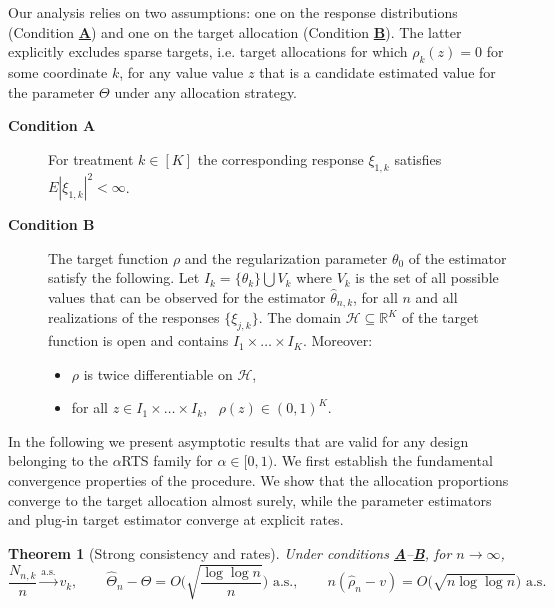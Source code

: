 \documentclass[11pt]{article}
\theoremstyle{plain}
\newtheorem{theorem}{Theorem}[section]
\theoremstyle{definition}
\begin{document}
Our analysis relies on two assumptions: one on the response distributions (Condition \hyperlink{CA}{\textbf{A}}) and one on the target allocation (Condition \hyperlink{CB}{\textbf{B}}). The latter explicitly excludes sparse targets, i.e. target allocations for which $\rho_k(z)=0$ for some coordinate $k$, for any value value $z$ that is a candidate estimated value for the parameter $\Theta$ under any allocation strategy.

\begin{description}
	\item[\hypertarget{CA}{\textbf{Condition A}}] For treatment \(k \in [K]\) the corresponding response \(\xi_{1,k}\) satisfies  $
	E|\xi_{1,k}|^{2} < \infty $. \\
	
	\item[\hypertarget{CB}{\textbf{Condition B}}] The target function $\rho$ and the regularization parameter $\theta_0$ of the estimator satisfy the following. Let $I_k = \{\theta_k\} \bigcup V_k$ where $V_k$ is the set of all possible values that can be observed for the estimator $\hat\theta_{n,k}$, for all $n$ and all realizations of the responses $\{\xi_{j,k}\}$. The domain $\mathcal{H} \subseteq \mathbb{R}^K$ of the target function is open and contains $I_1\times \dots \times I_K$. Moreover:
	\begin{itemize}
		\item \(\rho\) is twice differentiable on $\mathcal{H}$,
		\item for all $z \in I_1\times \dots \times I_k$, \ \(\rho(z) \in (0,1)^K\).
	\end{itemize}
\end{description}

In the following we present asymptotic results that are valid for any design belonging to the \(\alpha\)RTS family for \(\alpha \in [0,1)\). We first establish the fundamental convergence properties of the procedure. We show that the allocation proportions converge to the target allocation almost surely, while the parameter estimators and plug-in target estimator converge at explicit rates.

\begin{theorem}[Strong consistency and rates]\label{thm:LLN}
	Under conditions \hyperlink{CA}{\textbf{A}}--\hyperlink{CB}{\textbf{B}}, for \(n \to \infty\),
	\[
	\frac{N_{n,k}}{n}\xrightarrow{\text{a.s.}}v_k,\qquad
	\hat\Theta_n-\Theta = O\!\Big(\sqrt{\frac{\log\log n}{n}}\Big)\text{ a.s.},\qquad
	n(\hat\rho_n-v)=O\!\big(\sqrt{n\log\log n}\big)\text{ a.s.}
	\]
\end{theorem}
\end{document}
